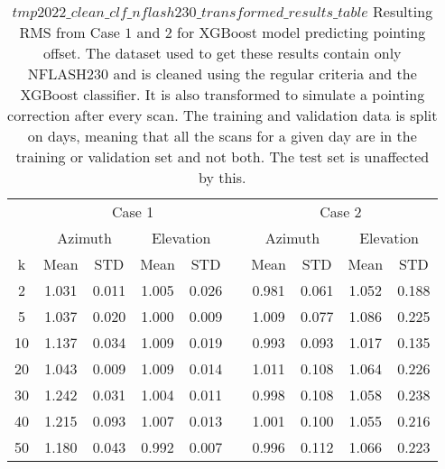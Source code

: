 \begin{table}[!htbp]
    \centering
    \caption{$tmp2022\_clean\_clf\_nflash230\_transformed\_results\_table$
    Resulting RMS from Case $1$ and $2$ for XGBoost model predicting pointing offset.
    The dataset used to get these results contain only NFLASH230 and is cleaned using the regular criteria and the XGBoost classifier.
    It is also transformed to simulate a pointing correction after every scan.
    The training and validation data is split on days, meaning that all the scans for a given day
    are in the training or validation set and not both. The test set is unaffected by this.}
    \begin{tabular}{ccccc c cccc}
        \toprule
        \multicolumn{1}{c}{} & \multicolumn{4}{c}{Case 1} & & \multicolumn{4}{c}{Case 2} \\
        \cmidrule(lr){2-5} \cmidrule(lr){7-10}
        \multicolumn{1}{c}{} & \multicolumn{2}{c}{Azimuth} & \multicolumn{2}{c}{Elevation} & & \multicolumn{2}{c}{Azimuth} & \multicolumn{2}{c}{Elevation} \\ 
        \cmidrule(lr){2-5} \cmidrule(lr){7-10}
        k & Mean & STD & Mean & STD & & Mean & STD & Mean & STD \\ 
        \midrule
         2 &     1.031 &     0.011 &     1.005 &     0.026 &  &  0.981 &     0.061 &     1.052 &     0.188 \\
         5 &     1.037 &     0.020 &     1.000 &     0.009 &  &  1.009 &     0.077 &     1.086 &     0.225 \\
        10 &     1.137 &     0.034 &     1.009 &     0.019 &  &  0.993 &     0.093 &     1.017 &     0.135 \\
        20 &     1.043 &     0.009 &     1.009 &     0.014 &  &  1.011 &     0.108 &     1.064 &     0.226 \\
        30 &     1.242 &     0.031 &     1.004 &     0.011 &  &  0.998 &     0.108 &     1.058 &     0.238 \\
        40 &     1.215 &     0.093 &     1.007 &     0.013 &  &  1.001 &     0.100 &     1.055 &     0.216 \\
        50 &     1.180 &     0.043 &     0.992 &     0.007 &  &  0.996 &     0.112 &     1.066 &     0.223 \\
        \bottomrule
    \end{tabular}
\end{table}


